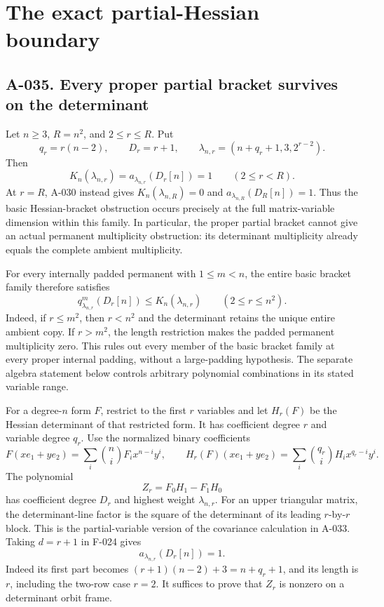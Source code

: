 \section{The exact partial-Hessian boundary}

\subsection*{A-035. Every proper partial bracket survives on the determinant}
Let \(n\geq3\), \(R=n^2\), and \(2\leq r\leq R\). Put
\[
 q_r=r(n-2),\qquad D_r=r+1,\qquad
 \lambda_{n,r}=(n+q_r+1,3,2^{r-2}).
                                                               \tag{A-035.1}
\]
Then
\[
 \boxed{\quad
 K_n(\lambda_{n,r})=a_{\lambda_{n,r}}(D_r[n])=1
                  \qquad(2\leq r<R).
 \quad}                                                        \tag{A-035.2}
\]
At \(r=R\), A-030 instead gives
\(K_n(\lambda_{n,R})=0\) and
\(a_{\lambda_{n,R}}(D_R[n])=1\).
Thus the basic Hessian-bracket obstruction occurs precisely
at the full matrix-variable dimension within this family.
In particular, the proper partial bracket cannot give an
actual permanent multiplicity obstruction: its determinant
multiplicity already equals the complete ambient multiplicity.

For every internally padded permanent with \(1\leq m<n\),
the entire basic bracket family therefore satisfies
\[
       q^m_{\lambda_{n,r}}(D_r[n])
                     \leq K_n(\lambda_{n,r})
                      \qquad(2\leq r\leq n^2).                \tag{A-035.2a}
\]
Indeed, if \(r\leq m^2\), then \(r<n^2\) and the
determinant retains the unique entire ambient copy.
If \(r>m^2\), the length restriction makes the padded
permanent multiplicity zero. This rules out every
member of the basic bracket family at every proper
internal padding, without a large-padding hypothesis.
The separate algebra statement below controls
arbitrary polynomial combinations in its stated
variable range.

For a degree-\(n\) form \(F\), restrict to the first \(r\)
variables and let \(H_r(F)\) be the Hessian determinant
of that restricted form. It has coefficient degree \(r\)
and variable degree \(q_r\). Use the normalized binary
coefficients
\[
 F(xe_1+ye_2)=\sum_i\binom ni F_i x^{n-i}y^i,\qquad
 H_r(F)(xe_1+ye_2)=\sum_i\binom{q_r}i H_i x^{q_r-i}y^i.
\]
The polynomial
\[
                         Z_r=F_0H_1-F_1H_0                 \tag{A-035.3}
\]
has coefficient degree \(D_r\) and highest weight
\(\lambda_{n,r}\). For an upper triangular matrix,
the determinant-line factor is the square of the
determinant of its leading \(r\)-by-\(r\) block.
This is the partial-variable version of the covariance
calculation in A-033.
Taking \(d=r+1\) in F-024 gives
\[
 a_{\lambda_{n,r}}(D_r[n])=1.
                                                               \tag{A-035.4}
\]
Indeed its first part becomes
\((r+1)(n-2)+3=n+q_r+1\), and its length is \(r\),
including the two-row case \(r=2\).
It suffices to prove that \(Z_r\) is nonzero on a
determinant orbit frame.

